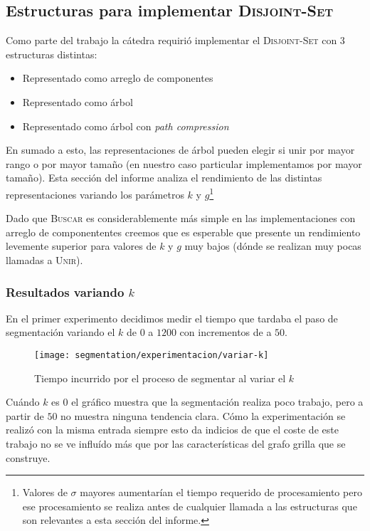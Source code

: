 \subsection{Estructuras para implementar \textsc{Disjoint-Set}}

Como parte del trabajo la cátedra requirió implementar el \textsc{Disjoint-Set}
con 3 estructuras distintas:

\begin{itemize}
	\item Representado como arreglo de componentes
	\item Representado como árbol
	\item Representado como árbol con \emph{path compression}
\end{itemize}

En sumado a esto, las representaciones de árbol pueden elegir si unir por mayor
rango o por mayor tamaño (en nuestro caso particular implementamos por mayor
tamaño). Esta sección del informe analiza el rendimiento de las distintas
representaciones variando los parámetros $k$ y $g$\footnote{Valores de $\sigma$
mayores aumentarían el tiempo requerido de procesamiento pero ese procesamiento
se realiza antes de cualquier llamada a las estructuras que son relevantes a
esta sección del informe.}

Dado que \textsc{Buscar} es considerablemente más simple en las
implementaciones con arreglo de componententes creemos que es esperable que
presente un rendimiento levemente superior para valores de $k$ y $g$ muy bajos
(dónde se realizan muy pocas llamadas a \textsc{Unir}).

\subsubsection{Resultados variando $k$}

En el primer experimento decidimos medir el tiempo que tardaba el paso de
segmentación variando el $k$ de $0$ a $1200$ con incrementos de a $50$.

\begin{figure}[h]
	\centering
	\texttt{[image: segmentation/experimentacion/variar-k]}
	\caption{Tiempo incurrido por el proceso de segmentar al variar el $k$}
\end{figure}

Cuándo $k$ es $0$ el gráfico muestra que la segmentación realiza poco trabajo,
pero a partir de $50$ no muestra ninguna tendencia clara. Cómo la
experimentación se realizó con la misma entrada siempre esto da indicios de que
el coste de este trabajo no se ve influído más que por las características del
grafo grilla que se construye.

